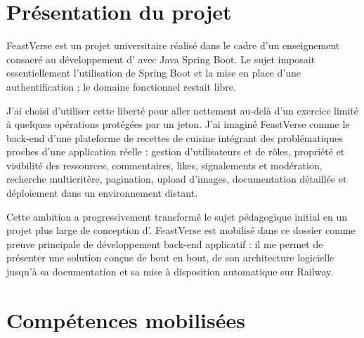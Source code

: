 \section{Présentation du projet}

FeastVerse est un projet universitaire réalisé dans le cadre d'un enseignement consacré au développement d' avec Java Spring Boot. Le sujet imposait essentiellement l'utilisation de Spring Boot et la mise en place d'une authentification  ; le domaine fonctionnel restait libre.

J'ai choisi d'utiliser cette liberté pour aller nettement au-delà d'un exercice limité à quelques opérations  protégées par un jeton. J'ai imaginé FeastVerse comme le back-end d'une plateforme de recettes de cuisine intégrant des problématiques proches d'une application réelle : gestion d'utilisateurs et de rôles, propriété et visibilité des ressources, commentaires, likes, signalements et modération, recherche multicritère, pagination, upload d'images, documentation détaillée et déploiement dans un environnement distant.

Cette ambition a progressivement transformé le sujet pédagogique initial en un projet plus large de conception d'. FeastVerse est mobilisé dans ce dossier comme preuve principale de développement back-end applicatif : il me permet de présenter une solution conçue de bout en bout, de son architecture logicielle jusqu'à sa documentation et sa mise à disposition automatique sur Railway.

\section{Compétences mobilisées}

